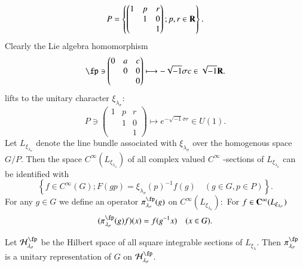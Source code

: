 $$
P= \left\{ \begin{pmatrix}
1 & p & r \\
  &  1 & 0\\
  &    & 1
\end{pmatrix}
; p, r \in \mathbf{R} \right\}.
$$
Clearly the Lie algebra homomorphism
$$
\fp \ni \begin{pmatrix}
0 & a & c \\
  &  0 & 0\\
  &    & 0
\end{pmatrix}
\longmapsto - \sqrt{-1}\sigma c \in \sqrt{-1}\bR.
$$
lifts to the unitary character $\xi_{\lambda_{\sigma}}$:
$$
P \ni \begin{pmatrix}
1 & p & r \\
  &  1 & 0\\
  &    & 1
\end{pmatrix}
\longmapsto e^{-\sqrt{-1}\sigma r} \in U(1).
$$
Let $L_{\xi_{\lambda_{\sigma}}}$ denote the line bundle associated with $\xi_{\lambda_{\sigma}}$ over the homogenous space $G /P$. Then the space $C^{\infty}(L_{\xi_{\lambda_{\sigma}}})$ of all complex valued $C^{\infty}$ -sections of $L_{\xi_{\lambda_{\sigma}}}$ can be identified with
$$
\left\{ f \in C^{\infty}(G); F(gp) = \xi_{\lambda_{\sigma}}(p)^{-1}f(g) \quad (g \in G, p \in P)\right\}.
$$
For any $g \in G$ we define an operator $\pi_{\lambda_{\sigma}}^{\fp}(g)$ on $C^{\infty}(L_{\xi_{\lambda_{\sigma}}}):$
For $f \in \mathbf{C}^{\infty}(L_{\xi_{\lambda_{\sigma}}})$
$$
(\pi_{\lambda_{\sigma}}^{\fp}(g)f)(x)=f(g^{-1}x) \quad (x \in G).
$$

Let $\calH_{\lambda_{\sigma}}^{\fp}$ be the Hilbert space of all square integrable sections of $L_{\xi_{\lambda}}$. Then
$\pi_{\lambda_{\sigma}}^{\fp}$ is a unitary representation of $G$ on $\calH_{\lambda_{\sigma}}^{\fp}$.

